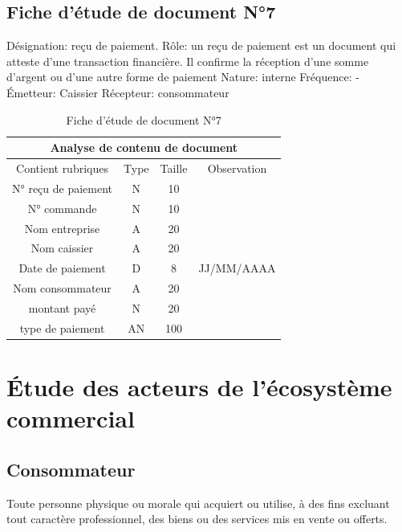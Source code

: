 \documentclass[edit,12pt,a4paper,ChapStyle,oneside,doubleinterligne]{report}
\begin{document}
\subsection{Fiche d’étude de document N°7}
\noindent Désignation: reçu de paiement.
\newline Rôle: un reçu de paiement est un document qui atteste d'une transaction financière. Il confirme la réception d'une somme d'argent ou d'une autre forme de paiement
\newline Nature: interne
\newline Fréquence: -
\newline Émetteur: Caissier
\newline Récepteur: consommateur \cite{reçu}
\begin{table}[h!]
    \centering
    \begin{tabular}{|c|c|c|c|}
         \hline
\multicolumn{4}{|c|}{Analyse de contenu de document}\\
\hline
Contient rubriques & Type & Taille & Observation\\
\hline
 N° reçu de paiement & N & 10 & \\
 N° commande  & N & 10 & \\
 Nom entreprise & A & 20 & \\
 Nom caissier & A & 20 & \\
 Date de paiement & D & 8 & JJ/MM/AAAA \\
Nom consommateur & A & 20 & \\
montant payé & N & 20 & \\
type de paiement & AN & 100 & \\
\hline
    \end{tabular}
    \caption{Fiche d’étude de document N°7}
    \label{tab:7}
\end{table}
\section{Étude des acteurs de l'écosystème commercial}
\subsection{Consommateur}
Toute personne physique ou morale qui acquiert ou utilise, à des fins excluant tout caractère professionnel, des biens ou des services mis en vente ou offerts\cite{Consommateur}.  
\end{document}

